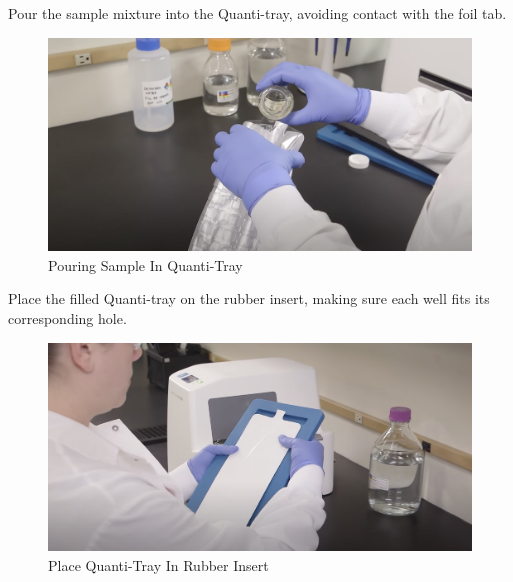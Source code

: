 \documentclass[12pt]{../SOP4_alpha}\usepackage[]{graphicx}\usepackage[]{xcolor}
\begin{document}
\NP Pour the sample mixture into the Quanti-tray, avoiding contact with the foil tab.

\begin{figure}[h!]
\includegraphics[scale=0.3]{PouringInQuanti-Tray.png}
\caption{Pouring Sample In Quanti-Tray}
\label{fig:Pouring Sample In Quanti-Tray}
\end{figure}

\NP Place the filled Quanti-tray on the rubber insert, making sure each well fits its corresponding hole.

\begin{figure}[h!]
\includegraphics[scale=0.3]{RubberInsert.png}
\caption{Place Quanti-Tray In Rubber Insert}
\label{fig:Place Quanti-Tray In Rubber Insert}
\end{figure}
\end{document}
